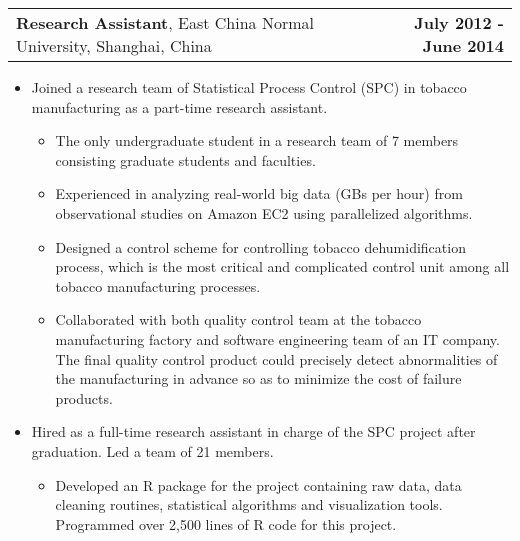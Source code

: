 \documentclass[11pt]{article}
\makeatletter
\newcommand{\headerrow}[2]
{\begin{tabular*}{\linewidth}{l@{\extracolsep{\fill}}r}
	#1 & #2 \\
\end{tabular*}
}
\makeatother
\begin{document}
\noindent\headerrow
{\textbf{Research Assistant}, East China Normal University, Shanghai, China}
{\textbf{July 2012 - June 2014}}
\begin{itemize}
	\item Joined a research team of Statistical Process Control (SPC) in tobacco manufacturing as a part-time research assistant.
	\begin{itemize}
		\item The only undergraduate student in a research team of 7 members consisting graduate students and faculties.
		\item Experienced in analyzing real-world big data (GBs per hour) from observational studies on Amazon EC2 using parallelized algorithms.
		\item Designed a control scheme for controlling tobacco dehumidification process, which is the most critical and complicated control unit among all tobacco manufacturing processes.
		\item Collaborated with both quality control team at the tobacco manufacturing factory and software engineering team of an IT company. The final quality control product could precisely detect abnormalities of the manufacturing in advance so as to minimize the cost of failure products.
	\end{itemize}

	\item Hired as a full-time research assistant in charge of the SPC project after graduation. Led a team of 21 members.
	\begin{itemize}
		\item Developed an R package for the project containing raw data, data cleaning routines, statistical algorithms and visualization tools. Programmed over 2,500 lines of R code for this project.
	\end{itemize}

\end{itemize}
\end{document}
